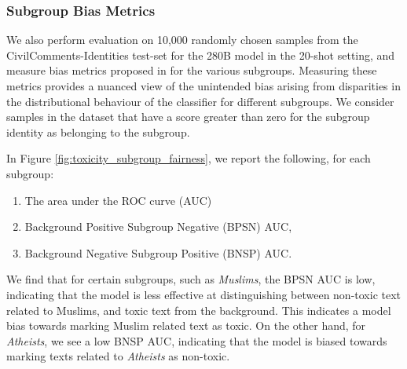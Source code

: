 \documentclass[11pt, a4paper, logo, internal, copyright, nonumbering]{deepmind}
\begin{document}
\subsubsection{Subgroup Bias Metrics}
We also perform evaluation on 10,000 randomly chosen samples from the CivilComments-Identities test-set \citep{nuanced_metrics} for the 280B model in the 20-shot setting, and measure bias metrics proposed in \cite{nuanced_metrics} for the various subgroups.
Measuring these metrics provides a nuanced view of the unintended bias arising from disparities in the distributional behaviour of the classifier for different subgroups.
We consider samples in the dataset that have a score greater than zero for the subgroup identity as belonging to the subgroup.

In Figure \ref{fig:toxicity_subgroup_fairness}, we report the following, for each subgroup:
\begin{enumerate}[label=(\alph*)]
    \item The area under the ROC curve (AUC)
    \item Background Positive Subgroup Negative (BPSN) AUC,
    \item Background Negative Subgroup Positive (BNSP) AUC.
\end{enumerate}
We find that for certain subgroups, such as \textit{Muslims}, the BPSN AUC is low, indicating that the model is less effective at distinguishing between non-toxic text related to Muslims, and toxic text from the background.
This indicates a model bias towards marking Muslim related text as toxic.
On the other hand, for \textit{Atheists}, we see a low BNSP AUC, indicating that
the model is biased towards marking texts related to \textit{Atheists} as non-toxic.
\end{document}

